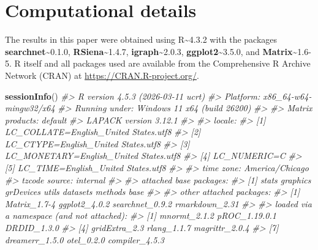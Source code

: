\documentclass[
]{article}
\newenvironment{Shaded}{\begin{snugshade}}{\end{snugshade}}
\newcommand{\CommentTok}[1]{\textcolor[rgb]{0.56,0.35,0.01}{\textit{#1}}}
\newcommand{\FunctionTok}[1]{\textcolor[rgb]{0.13,0.29,0.53}{\textbf{#1}}}
\newcommand{\NormalTok}[1]{#1}
\begin{document}
\section{Computational details}\label{sec:compdetails}

The results in this paper were obtained using
\textsf{R}\textasciitilde4.3.2 with the packages
\textbf{searchnet}\textasciitilde0.1.0,
\textbf{RSiena}\textasciitilde1.4.7,
\textbf{igraph}\textasciitilde2.0.3,
\textbf{ggplot2}\textasciitilde3.5.0, and
\textbf{Matrix}\textasciitilde1.6-5. \textsf{R} itself and all packages
used are available from the Comprehensive \textsf{R} Archive Network
(CRAN) at \url{https://CRAN.R-project.org/}.

\begin{Shaded}
\begin{Highlighting}[]
\FunctionTok{sessionInfo}\NormalTok{()}
\CommentTok{\#\textgreater{} R version 4.5.3 (2026{-}03{-}11 ucrt)}
\CommentTok{\#\textgreater{} Platform: x86\_64{-}w64{-}mingw32/x64}
\CommentTok{\#\textgreater{} Running under: Windows 11 x64 (build 26200)}
\CommentTok{\#\textgreater{} }
\CommentTok{\#\textgreater{} Matrix products: default}
\CommentTok{\#\textgreater{}   LAPACK version 3.12.1}
\CommentTok{\#\textgreater{} }
\CommentTok{\#\textgreater{} locale:}
\CommentTok{\#\textgreater{} [1] LC\_COLLATE=English\_United States.utf8 }
\CommentTok{\#\textgreater{} [2] LC\_CTYPE=English\_United States.utf8   }
\CommentTok{\#\textgreater{} [3] LC\_MONETARY=English\_United States.utf8}
\CommentTok{\#\textgreater{} [4] LC\_NUMERIC=C                          }
\CommentTok{\#\textgreater{} [5] LC\_TIME=English\_United States.utf8    }
\CommentTok{\#\textgreater{} }
\CommentTok{\#\textgreater{} time zone: America/Chicago}
\CommentTok{\#\textgreater{} tzcode source: internal}
\CommentTok{\#\textgreater{} }
\CommentTok{\#\textgreater{} attached base packages:}
\CommentTok{\#\textgreater{} [1] stats     graphics  grDevices utils     datasets  methods   base     }
\CommentTok{\#\textgreater{} }
\CommentTok{\#\textgreater{} other attached packages:}
\CommentTok{\#\textgreater{} [1] Matrix\_1.7{-}4    ggplot2\_4.0.2   searchnet\_0.9.2 rmarkdown\_2.31 }
\CommentTok{\#\textgreater{} }
\CommentTok{\#\textgreater{} loaded via a namespace (and not attached):}
\CommentTok{\#\textgreater{}   [1] mnormt\_2.1.2          pROC\_1.19.0.1         DRDID\_1.3.0          }
\CommentTok{\#\textgreater{}   [4] gridExtra\_2.3         rlang\_1.1.7           magrittr\_2.0.4       }
\CommentTok{\#\textgreater{}   [7] dreamerr\_1.5.0        otel\_0.2.0            compiler\_4.5.3       }

\end{Highlighting}
\end{Shaded}
\end{document}

